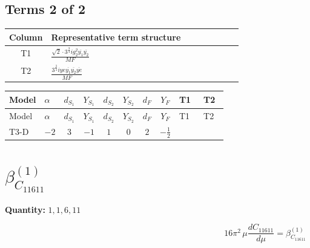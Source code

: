 \documentclass[8pt]{article}
\begin{document}
\begin{landscape}
\subsection*{Terms 2 of 2}
\begin{center}
\begin{tabular}{@{}c >{\raggedright\arraybackslash}p{0.82\linewidth}@{}}
\toprule
Column & Representative term structure \\
\midrule
T1 & \(\displaystyle \frac{\sqrt{2} \cdot 3^{\frac{3}{4}} i g_{2}^{2} \overline{y_{1}} \overline{y_{2}}}{MF}\) \\
\midrule
T2 & \(\displaystyle \frac{3^{\frac{3}{4}} i ye \overline{y_{1}} \overline{y_{2}} \overline{ye}}{MF}\) \\
\midrule
\bottomrule
\end{tabular}
\end{center}
\smallskip
\tiny
\begin{longtable}{@{}llcccccc >{\raggedright\arraybackslash}p{0.21\linewidth} >{\raggedright\arraybackslash}p{0.21\linewidth}@{}}
\toprule
Model & $\alpha$ & $d_{S_1}$ & $Y_{S_1}$ & $d_{S_2}$ & $Y_{S_2}$ & $d_F$ & $Y_F$ & T1 & T2 \\
\midrule
\endfirsthead
\toprule
Model & $\alpha$ & $d_{S_1}$ & $Y_{S_1}$ & $d_{S_2}$ & $Y_{S_2}$ & $d_F$ & $Y_F$ & T1 & T2 \\
\midrule
\endhead
T3-D & $-2$ & $3$ & $-1$ & $1$ & $0$ & $2$ & $-\frac{1}{2}$ & \scriptsize\adjustbox{max width=\linewidth}{$\begin{gathered} - \frac{\sqrt{2} \cdot 3^{\frac{3}{4}} i g_{2}^{2} \overline{y_{1}} \overline{y_{2}}}{3 MF}\end{gathered}$} & \scriptsize\adjustbox{max width=\linewidth}{$\begin{gathered} \frac{3^{\frac{3}{4}} i ye \overline{y_{1}} \overline{y_{2}} \overline{ye}}{12 MF}\end{gathered}$} \\
\midrule
\bottomrule
\end{longtable}
\clearpage
\section*{$\beta_{C_{11611}}^{(1)}$}
\noindent\textbf{Quantity: }$\mathrm{1,1,6,11}$\par\smallskip
\[16\pi^2\,\mu\frac{d C_{11611}}{d\mu}=\beta_{C_{11611}}^{(1)}\]

\end{landscape}
\end{document}
